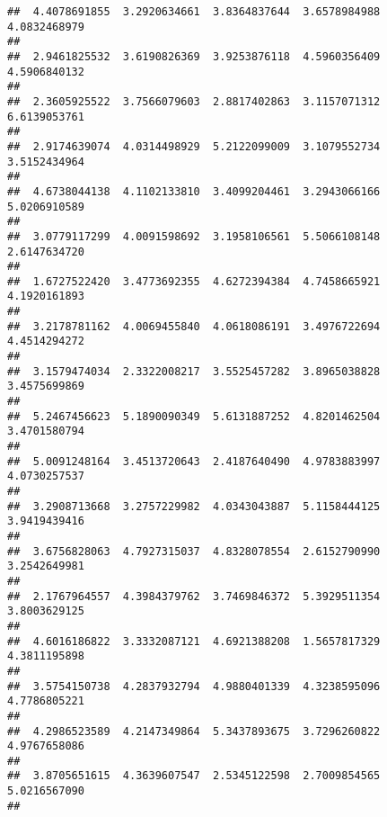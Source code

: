 \documentclass[]{article}
\begin{document}
\begin{verbatim}
##  4.4078691855  3.2920634661  3.8364837644  3.6578984988  4.0832468979 
##                                                                       
##  2.9461825532  3.6190826369  3.9253876118  4.5960356409  4.5906840132 
##                                                                       
##  2.3605925522  3.7566079603  2.8817402863  3.1157071312  6.6139053761 
##                                                                       
##  2.9174639074  4.0314498929  5.2122099009  3.1079552734  3.5152434964 
##                                                                       
##  4.6738044138  4.1102133810  3.4099204461  3.2943066166  5.0206910589 
##                                                                       
##  3.0779117299  4.0091598692  3.1958106561  5.5066108148  2.6147634720 
##                                                                       
##  1.6727522420  3.4773692355  4.6272394384  4.7458665921  4.1920161893 
##                                                                       
##  3.2178781162  4.0069455840  4.0618086191  3.4976722694  4.4514294272 
##                                                                       
##  3.1579474034  2.3322008217  3.5525457282  3.8965038828  3.4575699869 
##                                                                       
##  5.2467456623  5.1890090349  5.6131887252  4.8201462504  3.4701580794 
##                                                                       
##  5.0091248164  3.4513720643  2.4187640490  4.9783883997  4.0730257537 
##                                                                       
##  3.2908713668  3.2757229982  4.0343043887  5.1158444125  3.9419439416 
##                                                                       
##  3.6756828063  4.7927315037  4.8328078554  2.6152790990  3.2542649981 
##                                                                       
##  2.1767964557  4.3984379762  3.7469846372  5.3929511354  3.8003629125 
##                                                                       
##  4.6016186822  3.3332087121  4.6921388208  1.5657817329  4.3811195898 
##                                                                       
##  3.5754150738  4.2837932794  4.9880401339  4.3238595096  4.7786805221 
##                                                                       
##  4.2986523589  4.2147349864  5.3437893675  3.7296260822  4.9767658086 
##                                                                       
##  3.8705651615  4.3639607547  2.5345122598  2.7009854565  5.0216567090 
##                                                                       

\end{verbatim}
\end{document}
